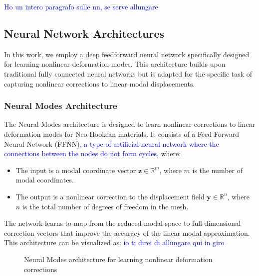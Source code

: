 \textcolor{blue}{Ho un intero paragrafo sulle nn, se serve allungare}

\subsection{Neural Network Architectures}
In this work, we employ a deep feedforward neural network specifically designed for learning nonlinear deformation modes. This architecture builds upon traditional fully connected neural networks but is adapted for the specific task of capturing nonlinear corrections to linear modal displacements.

\subsubsection{Neural Modes Architecture}
The Neural Modes architecture is designed to learn nonlinear corrections to linear deformation modes for Neo-Hookean materials. It consists of a Feed-Forward Neural Network (FFNN)\textcolor{blue}{, a type of artificial neural network where the connections between the nodes do not form cycles,} where:

\begin{itemize}
    \item The input is a modal coordinate vector \( \bm{z} \in \mathbb{R}^m \), where $m$ is the number of modal coordinates.
    \item The output is a nonlinear correction to the displacement field \( \bm{y} \in \mathbb{R}^n \), where $n$ is the total number of degrees of freedom in the mesh.
\end{itemize}

The network learns to map from the reduced modal space to full-dimensional correction vectors that improve the accuracy of the linear modal approximation. This architecture can be visualized as: \textcolor{blue}{io ti direi di allungare qui in giro}
\begin{figure}[H] 
    \centering
    \caption{Neural Modes architecture for learning nonlinear deformation corrections}
    \label{fig:neural_modes_arch}
\end{figure}

